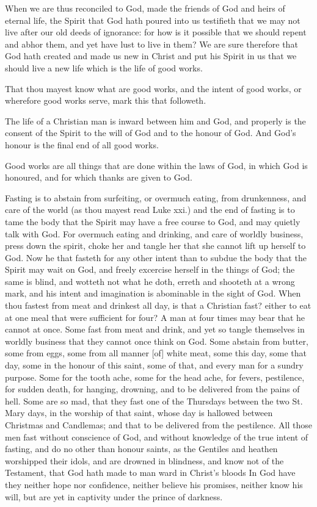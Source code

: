 When we are thus reconciled to God, made the friends 
of God and heirs of eternal life, the Spirit that God hath 
poured into us testifieth that we may not live after our old 
deeds of ignorance: for how is it possible that we should 
repent and abhor them, and yet have lust to live in them? 
We are sure therefore that God hath created and made us 
new in Christ and put his Spirit in us that we should live 
a new life which is the life of good works. 

That thou mayest know what are good works, and the 
intent of good works, or wherefore good works serve, mark 
this that followeth. 

The life of a Christian man is inward between him and 
God, and properly is the consent of the Spirit to the will 
of God and to the honour of God. And God's honour is the 
final end of all good works. 

Good works are all things that are done within the laws 
of God, in which God is honoured, and for which thanks 
are given to God. 

Fasting is to abstain from surfeiting, or overmuch eating, 
from drunkenness, and care of the world (as thou mayest 
read Luke xxi.) and the end of fasting is to tame the body 
that the Spirit may have a free course to God, and may 
quietly talk with God. For overmuch eating and drinking, 
and care of worldly business, press down the spirit, choke 
her and tangle her that she cannot lift up herself to God. 
Now he that fasteth for any other intent than to subdue 
the body that the Spirit may wait on God, and freely excercise
herself in the things of God; the same is blind, 
and wotteth not what he doth, erreth and shooteth at a 
wrong mark, and his intent and imagination is abominable 
in the sight of God. When thou fastest from meat and 
drinkest all day, is that a Christian fast? either to eat at 
one meal that were sufficient for four? A man at four 
times may bear that he cannot at once. Some fast from 
meat and drink, and yet so tangle themselves in worldly 
business that they cannot once think on God. Some 
abstain from butter, some from eggs, some from all manner 
[of] white meat, some this day, some that day, some in the 
honour of this saint, some of that, and every man for a 
sundry purpose. Some for the tooth ache, some for the 
head ache, for fevers, pestilence, for sudden death, for 
hanging, drowning, and to be delivered from the pains of 
hell. Some are so mad, that they fast one of the Thursdays 
between the two St. Mary days, in the worship of that 
saint, whose day is hallowed between Christmas and Candlemas;
and that to be delivered from the pestilence. All 
those men fast without conscience of God, and without 
knowledge of the true intent of fasting, and do no other 
than honour saints, as the Gentiles and heathen worshipped 
their idols, and are drowned in blindness, and know not 
of the Testament, that God hath made to man ward in 
Christ's bloods In God have they neither hope nor confidence,
neither believe his promises, neither know his will, 
but are yet in captivity under the prince of darkness. 


